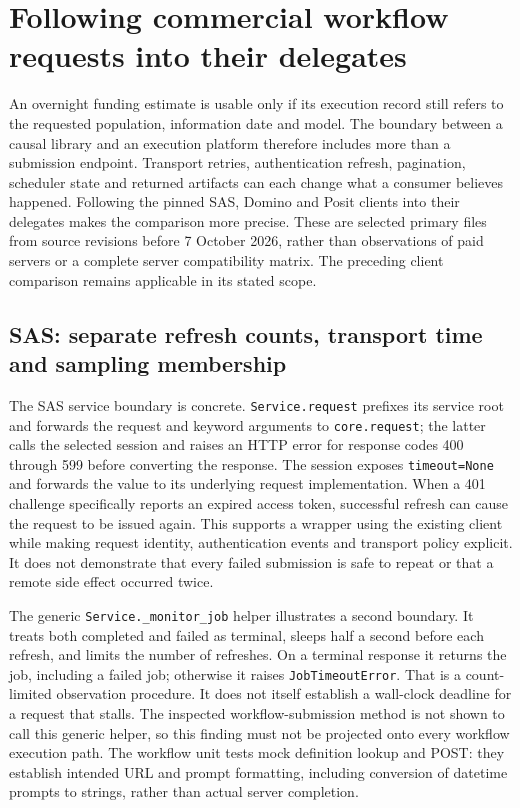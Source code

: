 \section{Following commercial workflow requests into their delegates}
\label{sec:exec23-workflow-delegates}

An overnight funding estimate is usable only if its execution record still
refers to the requested population, information date and model. The boundary
between a causal library and an execution platform therefore includes more
than a submission endpoint. Transport retries, authentication refresh,
pagination, scheduler state and returned artifacts can each change what a
consumer believes happened. Following the pinned SAS, Domino and Posit
clients into their delegates makes the comparison more precise. These are
selected primary files from source revisions before 7 October 2026, rather
than observations of paid servers or a complete server compatibility matrix.
The preceding client comparison remains applicable in its stated scope.
\citep{exec23_workflow_delegates_sasctl,
exec23_workflow_delegates_dominopy,exec23_workflow_delegates_positgo}

\subsection{SAS: separate refresh counts, transport time and sampling membership}

The SAS service boundary is concrete. \texttt{Service.request} prefixes its
service root and forwards the request and keyword arguments to
\texttt{core.request}; the latter calls the selected session and raises an
HTTP error for response codes 400 through 599 before converting the response.
The session exposes \texttt{timeout=None} and forwards the value to its
underlying request implementation. When a 401 challenge specifically reports
an expired access token, successful refresh can cause the request to be
issued again. This supports a wrapper using the existing client while making
request identity, authentication events and transport policy explicit. It
does not demonstrate that every failed submission is safe to repeat or that
a remote side effect occurred twice.
\citep{exec23_workflow_delegates_sasctl}

The generic \texttt{Service.\_monitor\_job} helper illustrates a second
boundary. It treats both completed and failed as terminal, sleeps half a
second before each refresh, and limits the number of refreshes. On a
terminal response it returns the job, including a failed job; otherwise it
raises \texttt{JobTimeoutError}. That is a count-limited observation
procedure. It does not itself establish a wall-clock deadline for a request
that stalls. The inspected workflow-submission method is not shown to call
this generic helper, so this finding must not be projected onto every
workflow execution path. The workflow unit tests mock definition lookup and
POST: they establish intended URL and prompt formatting, including conversion
of datetime prompts to strings, rather than actual server completion.
\citep{exec23_workflow_delegates_sasctl}

